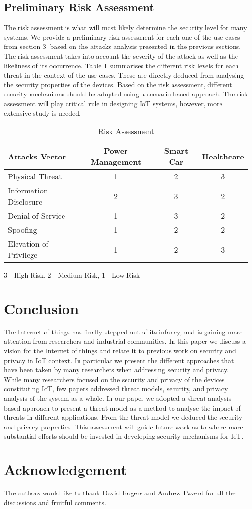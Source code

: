\documentclass{llncs}
\begin{document}
\subsection{Preliminary Risk Assessment}
The risk assessment is what will most likely determine the security level for many systems. We provide a preliminary risk assessment for each one of the use cases from section 3, based on the attacks analysis presented in the previous sections. The risk assessment takes into account the severity of the attack as well as the likeliness of its occurrence. Table 1 summarises the different risk levels for each threat in the context of the use cases. These are directly deduced from analysing the security properties of the devices. Based on the risk assessment, different security mechanisms should be adopted using a scenario based approach. The risk assessment will play critical rule in designing IoT systems, however, more extensive study is needed.
\begin{table}[!htb]
\centering
\begin{tabular}{|l|c|c|c|}
\hline
\textbf{Attacks Vector} &Power Management &Smart Car &Healthcare  \\
\hline
Physical Threat &1 &2 &3\\
\hline 
Information Disclosure &2 &3 &2\\
\hline
Denial-of-Service &1 &3 &2 \\
\hline 
Spoofing &1 &2 &2\\
\hline 
Elevation of Privilege &1 &2 &3\\
\hline 
\end{tabular}
\newline
\caption{Risk Assessment} 3 - High Risk,  2 - Medium Risk, 1 - Low Risk
\label{tab:my_label1}
\end{table}
\section{Conclusion}
The Internet of things has finally stepped out of its infancy, and is gaining more attention from researchers and industrial communities. In this paper we discuss a vision for the Internet of things and relate it to previous work on security and privacy in IoT context. In particular we present the different approaches that have been taken by many researchers when addressing security and privacy. While many researchers focused on the security and privacy of the devices constituting IoT, few papers addressed threat models, security, and privacy analysis of the system as a whole. In our paper we adopted a threat analysis based approach to present a threat model as a method to analyse the impact of threats in different applications. From the threat model we deduced the security and privacy properties. This assessment will guide future work as to where more substantial efforts should be invested in developing security mechanisms for IoT.
\section{Acknowledgement} 
The authors would like to thank David Rogers and Andrew Paverd for all the discussions and fruitful comments.


\raggedright 



\end{document}
